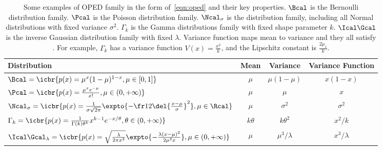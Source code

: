 \begin{table*}
\caption{
Some examples of OPED family in the form of~\cref{eqn:oped} and their key properties. $\Bcal$ is the Bernoulli distribution family. 
$\Pcal$ is the Poisson distribution family. 
$\Ncal_\sigma$ is the distribution family, including all Normal distributions with fixed variance $\sigma^2$. 
$\Gamma_k$ is the Gamma distributions family with fixed shape parameter $k$.
$\Ical\Gcal$ is the inverse Gaussian distribution family with fixed $\lambda$.
Variance function maps mean to variance and they all satisfy . 
For example, $\Gamma_k$ has a variance function $V(x)=\frac{x^2}{k}$, and the Lipschitz constant is $\frac{2\mu_1}{k}$.}
\centering
\begin{tabular}{l|c|c|c}
    \hline \hline
    Distribution & Mean & Variance & Variance Function \\ \hline
    $\Bcal = \icbr{p(x) = \mu^{x} (1-\mu)^{1-x}, \mu \in [0, 1]}$&
        $\mu$ & $\mu(1-\mu)$     & $x(1-x)$  \\ \hline
    $\Pcal = \icbr{p(x) = \frac{\mu^x e^{-\mu}}{x!}, \mu \in (0, +\infty)}$&
        $\mu$ &      $\mu$      & $x$  \\ \hline
    $\Ncal_\sigma = \icbr{p(x) = \frac{1}{\sigma \sqrt{2\pi}} \expto{-\fr12 \del{\frac{x-\mu}{\sigma}}^2}, \mu \in \Rcal}$      &
        $\mu$ & $  \sigma^2$    & $\sigma^2$  \\ \hline
    $\Gamma_k = \icbr{p(x) = \frac{1}{\Gamma(k) \theta^k} x^{k-1} e^{-x/\theta}, \theta \in (0, +\infty)}$      &
        $k\theta$ & $k\theta^2$ & $x^2/k$  \\ \hline
    $\Ical\Gcal_\lambda = \icbr{p(x) = \sqrt{\frac{\lambda}{2\pi x^3}} \expto{-\frac{\lambda (x-\mu)^2}{2\mu^2 x}}, \mu \in (0, +\infty)}$ &
        $\mu$ & $\mu^3/\lambda$ & $x^3/\lambda$ \\ \hline \hline
 \end{tabular}
\label{tab:variance-function}
\end{table*}
